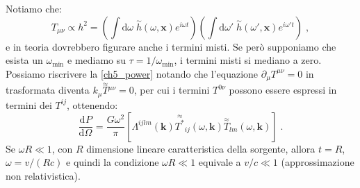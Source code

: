 \documentclass[12pt,a4paper]{report}
\theoremstyle{definition}
\newcommand{\dev}[3][]{\frac{\mathrm{d}^{#1} #2}{\mathrm{d} #3^{#1}}}
\newcommand{\diff}[1][]{\mathrm{d}#1}
\begin{document}
Notiamo che:
$$
T_{\mu\nu}\propto h^2=\left(\int\diff{\omega}\; \stackrel{\sim}{h}(\omega,\mathbf{x})e^{i\omega t}\right)\left(\int\diff{\omega'}\;\stackrel{\sim}{h}(\omega',\mathbf{x})e^{i\omega' t}\right)\;,
$$
e in teoria dovrebbero figurare anche i termini misti. Se però supponiamo che esista un $\omega_{\mathrm{min}}$ e mediamo su $\tau=1/\omega_{\mathrm{min}}$, i termini misti si mediano a zero. \\
Possiamo riscrivere la \eqref{ch5_power} notando che l'equazione $\partial_{\mu}T^{\mu\nu}=0$ in trasformata diventa $k_{\mu}\stackrel{\approx}{T}{}^{\mu\nu}=0$, per cui i termini $T^{0\nu}$ possono essere espressi in termini dei $T^{ij}$, ottenendo:
\begin{equation}
\dev{P}{\Omega}=\frac{G\omega^2}{\pi}\left[\Lambda^{ijlm}(\mathbf{k})\stackrel{\approx}{T^*}_{ij}(\omega,\mathbf{k})\stackrel{\approx}{T}_{lm}(\omega,\mathbf{k})\right]\;.
\end{equation}
Se $\omega R\ll 1$, con $R$ dimensione lineare caratteristica della sorgente, allora $t=R$, $\omega=v/(Rc)$ e quindi la condizione $\omega R\ll 1$ equivale a $v/c\ll 1$ (approssimazione non relativistica).
\end{document}
